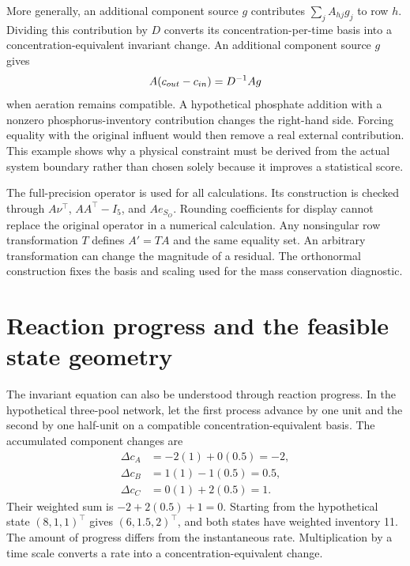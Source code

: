 More generally, an additional component source $g$ contributes $\sum_jA_{hj}g_j$ to row $h$. Dividing this contribution by $D$ converts its concentration-per-time basis into a concentration-equivalent invariant change. An additional component source $g$ gives
\begin{equation}
\equationname{Invariant inventory change with an external source}
A(c_{out}-c_{in})=D^{-1}Ag
\label{eq:general_invariant_source}
\end{equation}
when aeration remains compatible. A hypothetical phosphate addition with a nonzero phosphorus-inventory contribution changes the right-hand side. Forcing equality with the original influent would then remove a real external contribution. This example shows why a physical constraint must be derived from the actual system boundary rather than chosen solely because it improves a statistical score.

The full-precision operator is used for all calculations. Its construction is checked through $A\nu^\top$, $AA^\top-I_5$, and $Ae_{S_O}$. Rounding coefficients for display cannot replace the original operator in a numerical calculation. Any nonsingular row transformation $T$ defines $A'=TA$ and the same equality set. An arbitrary transformation can change the magnitude of a residual. The orthonormal construction fixes the basis and scaling used for the mass conservation diagnostic.

\section{Reaction progress and the feasible state geometry}

The invariant equation can also be understood through reaction progress. In the hypothetical three-pool network, let the first process advance by one unit and the second by one half-unit on a compatible concentration-equivalent basis. The accumulated component changes are
\[
\begin{aligned}
\Delta c_A&=-2(1)+0(0.5)=-2,\\
\Delta c_B&=1(1)-1(0.5)=0.5,\\
\Delta c_C&=0(1)+2(0.5)=1.
\end{aligned}
\]
Their weighted sum is $-2+2(0.5)+1=0$. Starting from the hypothetical state $(8,1,1)^\top$ gives $(6,1.5,2)^\top$, and both states have weighted inventory 11. The amount of progress differs from the instantaneous rate. Multiplication by a time scale converts a rate into a concentration-equivalent change.

